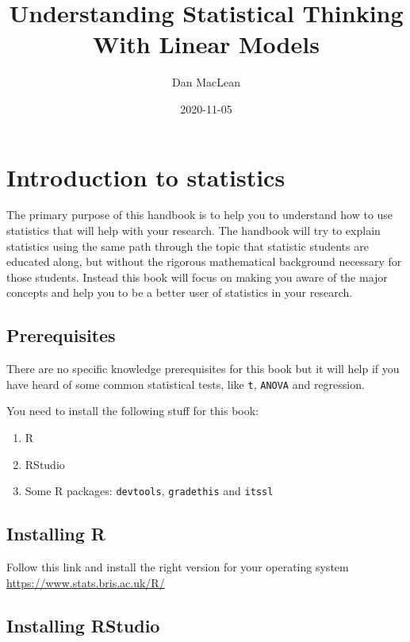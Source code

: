 \documentclass[
]{book}
\title{Understanding Statistical Thinking With Linear Models}
\author{Dan MacLean}
\date{2020-11-05}
\providecommand{\tightlist}{%
  \setlength{\itemsep}{0pt}\setlength{\parskip}{0pt}}
\begin{document}
\maketitle

{
\setcounter{tocdepth}{1}
\tableofcontents
}
\hypertarget{introduction-to-statistics}{%
\chapter{Introduction to statistics}\label{introduction-to-statistics}}

The primary purpose of this handbook is to help you to understand how to use statistics that will help with your research. The handbook will try to explain statistics using the same path through the topic that statistic students are educated along, but without the rigorous mathematical background necessary for those students. Instead this book will focus on making you aware of the major concepts and help you to be a better user of statistics in your research.

\hypertarget{prerequisites}{%
\section{Prerequisites}\label{prerequisites}}

There are no specific knowledge prerequisites for this book but it will help if you have heard of some common statistical tests, like \texttt{t}, \texttt{ANOVA} and regression.

You need to install the following stuff for this book:

\begin{enumerate}
\def\labelenumi{\arabic{enumi}.}
\tightlist
\item
  R
\item
  RStudio
\item
  Some R packages: \texttt{devtools}, \texttt{gradethis} and \texttt{itssl}
\end{enumerate}

\hypertarget{installing-r}{%
\section{Installing R}\label{installing-r}}

Follow this link and install the right version for your operating system \url{https://www.stats.bris.ac.uk/R/}

\hypertarget{installing-rstudio}{%
\section{Installing RStudio}\label{installing-rstudio}}
\end{document}
